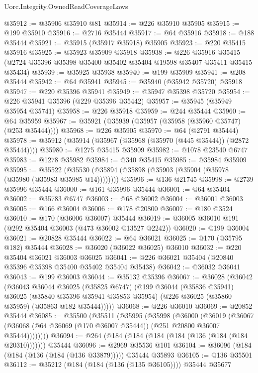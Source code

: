 \begin{lexlean}{Uorc.Integrity.OwnedReadCoverageLaws}
\begin{coremodule}
@35912 := @35906 @35910 @81
@35914 := @226 @35910 @35905
@35915 := @199 @35910
@35916 := @2716 @35444
@35917 := @64 @35916
@35918 := @188 @35444
@35921 := @35915 (@35917 @35918) @35905
@35923 := @220 @35415 @35916
@35925 := @35923 @35909 @35918
@35938 := @226
    @35916
    @35415
    (@2724 @35396 @35398 @35400 @35402 @35404 @19598 @35407 @35411 @35415 @35434)
@35939 := @35925 @35938
@35940 := @199 @35909
@35941 := @208 @35444
@35942 := @64 @35941
@35945 := @35940 (@35942 @35720) @35918
@35947 := @220 @35396 @35941
@35949 := @35947 @35398 @35720
@35954 := @226 @35941 @35396 (@229 @35396 @35442)
@35957 := @35945 (@35949 @35954 @35741)
@35958 := @226 @35918
@35959 := @244 @35444
@35960 := @64 @35959
@35967 := @35921 (@35939 (@35957 (@35958 (@35960 @35747) (@253 @35444))))
@35968 := @226 @35905
@35970 := @64 (@2791 @35444)
@35978 := @35912 (@35914 (@35967 (@35968 (@35970 (@445 @35444)) (@2872 @35444))))
@35980 := @1275 @35415 @35909
@35982 := @1078 @23540 @6747
@35983 := @1278 @35982
@35984 := @340 @35415
@35985 := @35984 @35909
@35995 := @35522 (@35530 (@35894 (@35898 (@35903 (@35904 (@35978 (@35980 (@35983 @35985 @14))))))))
@35996 := @136 @21745
@35998 := @2739 @35996 @35444
@36000 := @161 @35996 @35444
@36001 := @64 @35404
@36002 := @35783 @6747
@36003 := @68 @36002
@36004 := @36001 @36003
@36005 := @166 @36004
@36006 := @178 @20800
@36007 := @180 @3524
@36010 := @170 (@36006 @36007) @35444
@36019 := @36005 @36010 @191 (@292 @35404 @36003 (@473 @36002 @13527 @2242))
@36020 := @199 @36004
@36021 := @20828 @35444
@36022 := @64 @36021
@36025 := @170 (@35795 @182) @35444
@36028 := @36020 (@36022 @36025) @36010
@36032 := @220 @35404 @36021 @36003 @36025
@36041 := @226 @36021 @35404 (@20840 @35396 @35398 @35400 @35402 @35404 @35438)
@36042 := @36032 @36041
@36043 := @199 @36003
@36044 := @35132 @35396
@36067 := @36028
    (@36042
      (@36043
        @36044
        @36025
        (@35825 @6747)
        (@199
          @36044
          (@35836 @35941)
          @36025
          (@35840 @35396 @35941 @35853 @35954)
          (@226 @36025 (@35860 @35959) (@35863 @182 @35444)))))
@36068 := @226 @36010
@36069 := @20852 @35444
@36085 := @35500
    (@35511
      (@35995
        (@35998
          (@36000
            (@36019
              (@36067 (@36068 (@64 @36069 (@170 @36007 @35444)) (@251 @20800 @36007 @35444))))))))
@36094 := @264 (@184 (@184 (@184 (@184 (@136 (@184 (@184 @20310))))))) @35444
@36096 := @2969 @35536 @101
@36104 := @36096 (@184 (@184 (@136 (@184 (@136 @33879))))) @35444 @35893
@36105 := @136 @35501
@36112 := @35212 (@184 (@184 (@136 (@135 @36105)))) @35444 @35677

\end{coremodule}
\end{lexlean}
